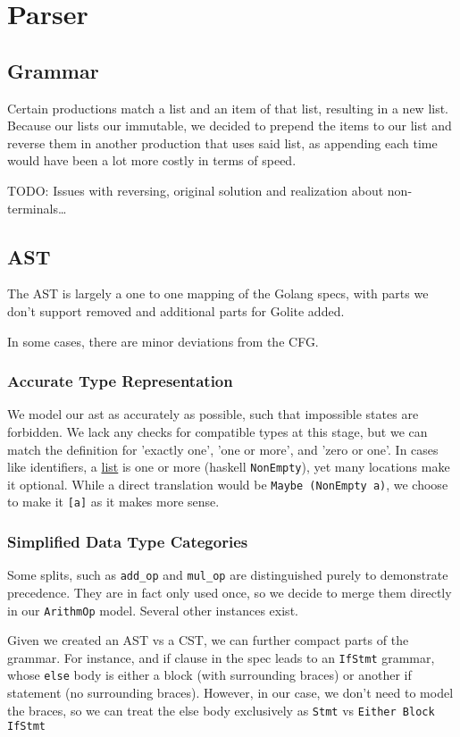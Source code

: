 \documentclass[11pt]{article}
\begin{document}
\section{Parser}
\label{sec:org15254e2}
\subsection{Grammar}
\label{sec:orgc618b4a}
Certain productions match a list and an item of that list,
resulting in a new list. Because our lists our immutable, we
decided to prepend the items to our list and reverse them in
another production that uses said list, as appending each time
would have been a lot more costly in terms of speed.

TODO: Issues with reversing, original solution and realization about
non-terminals\ldots{}
\subsection{AST}
\label{sec:orge28ec60}
The AST is largely a one to one mapping of the Golang specs, with
parts we don't support removed and additional parts for Golite added.

In some cases, there are minor deviations from the CFG.
\subsubsection{Accurate Type Representation}
\label{sec:orgaece341}
We model our ast as accurately as possible, such that impossible
states are forbidden. We lack any checks for compatible types at
this stage, but we can match the definition for 'exactly one', 'one
or more', and 'zero or one'. In cases like identifiers, a \href{https://golang.org/ref/spec\#IdentifierList}{list} is
one or more (haskell \texttt{NonEmpty}), yet many locations make it
optional. While a direct translation would be \texttt{Maybe (NonEmpty a)},
we choose to make it \texttt{[a]} as it makes more sense.
\subsubsection{Simplified Data Type Categories}
\label{sec:orgd021150}
Some splits, such as \texttt{add\_op} and \texttt{mul\_op} are distinguished
purely to demonstrate precedence. They are in fact only used once,
so we decide to merge them directly in our \texttt{ArithmOp}
model. Several other instances exist.

Given we created an AST vs a CST, we can further compact parts of
the grammar. For instance, and if clause in the spec leads to an
\texttt{IfStmt} grammar, whose \texttt{else} body is either a block (with
surrounding braces) or another if statement (no surrounding
braces). However, in our case, we don't need to model the braces,
so we can treat the else body exclusively as \texttt{Stmt} vs \texttt{Either
    Block IfStmt}
\end{document}
